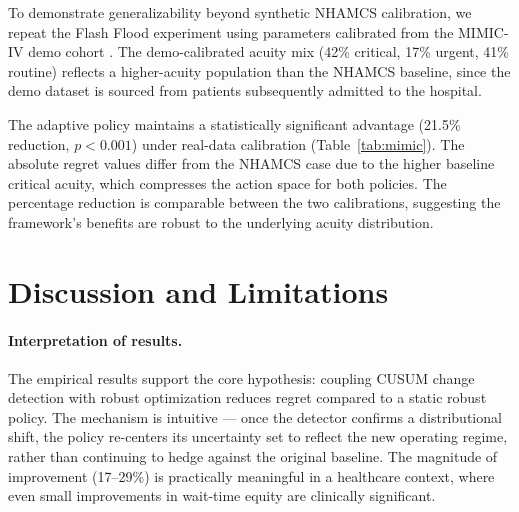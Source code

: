 \documentclass[11pt,twocolumn]{article}
\theoremstyle{plain}
\theoremstyle{definition}
\begin{document}
To demonstrate generalizability beyond synthetic NHAMCS calibration, we repeat the Flash Flood experiment using parameters calibrated from the MIMIC-IV demo cohort \cite{johnson2023mimic}. The demo-calibrated acuity mix (42\% critical, 17\% urgent, 41\% routine) reflects a higher-acuity population than the NHAMCS baseline, since the demo dataset is sourced from patients subsequently admitted to the hospital.

\begin{table}[!htbp]
\centering
\caption{MIMIC-IV validation (Flash Flood, 48-hour horizon).}
\label{tab:mimic}
\small
{}
\end{table}

The adaptive policy maintains a statistically significant advantage (21.5\% reduction, $p < 0.001$) under real-data calibration (Table~\ref{tab:mimic}). The absolute regret values differ from the NHAMCS case due to the higher baseline critical acuity, which compresses the action space for both policies. The percentage reduction is comparable between the two calibrations, suggesting the framework's benefits are robust to the underlying acuity distribution.

\section{Discussion and Limitations}

\paragraph{Interpretation of results.} The empirical results support the core hypothesis: coupling CUSUM change detection with robust optimization reduces regret compared to a static robust policy. The mechanism is intuitive --- once the detector confirms a distributional shift, the policy re-centers its uncertainty set to reflect the new operating regime, rather than continuing to hedge against the original baseline. The magnitude of improvement (17--29\%) is practically meaningful in a healthcare context, where even small improvements in wait-time equity are clinically significant.
\end{document}
